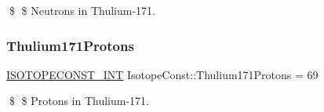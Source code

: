 \$ \$ Neutrons in Thulium-\/171. \mbox{\label{group___isotope_const-_thulium-_tm171_gad3ef552a0085b339e2495f7fd78b3628}} 
\subsubsection{\texorpdfstring{Thulium171\+Protons}{Thulium171Protons}}
{\footnotesize\ttfamily \mbox{\hyperlink{group___isotope_const-_macros_ga5f18360b3e99483a35c32d789e62621c}{I\+S\+O\+T\+O\+P\+E\+C\+O\+N\+S\+T\+\_\+\+I\+NT}} Isotope\+Const\+::\+Thulium171\+Protons = 69}

\$ \$ Protons in Thulium-\/171. 